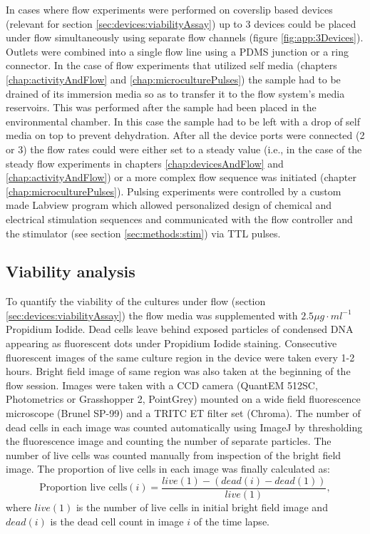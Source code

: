 In cases where flow experiments were performed on coverslip based devices (relevant for section \ref{sec:devices:viabilityAssay}) up to 3 devices could be placed under flow simultaneously using separate flow channels (figure \ref{fig:app:3Devices}). Outlets were combined into a single flow line using a PDMS junction or a ring connector. In the case of flow experiments that utilized self media (chapters \ref{chap:activityAndFlow} and \ref{chap:microculturePulses}) the sample had to be drained of its immersion media so as to transfer it to the flow system's media reservoirs. This was performed after the sample had been placed in the environmental chamber. In this case the sample had to be left with a drop of self media on top to prevent dehydration. After all the device ports were connected (2 or 3) the flow rates could were either set to a steady value (i.e., in the case of the steady flow experiments in chapters \ref{chap:devicesAndFlow} and \ref{chap:activityAndFlow}) or a more complex flow sequence was initiated (chapter \ref{chap:microculturePulses}). Pulsing experiments were controlled by a custom made Labview program which allowed personalized design of chemical and electrical stimulation sequences and communicated with the flow controller and the stimulator (see section \ref{sec:methods:stim}) via TTL pulses.






 \subsection{Viability analysis}
 To quantify the viability of the cultures under flow (section \ref{sec:devices:viabilityAssay}) the flow media was supplemented with \(2.5 \mu g\cdot ml^{-1}\) Propidium Iodide. Dead cells leave behind exposed particles of condensed DNA appearing as fluorescent dots under Propidium Iodide staining. Consecutive fluorescent images of the same culture region in the device were taken every 1-2 hours. Bright field image of same region was also taken at the beginning of the flow session. Images were taken with a CCD camera (QuantEM 512SC, Photometrics or Grasshopper 2, PointGrey) mounted on a wide field fluorescence microscope (Brunel SP-99) and a TRITC ET filter set (Chroma). The number of dead cells in each image was counted automatically using ImageJ by thresholding the fluorescence image and counting the number of separate particles. The number of live cells was counted manually from inspection of the bright field image.
The proportion of live cells in each image was finally calculated as: \[\text{Proportion live cells} (i)=\frac{live(1)-(dead(i)-dead(1))}{live(1)},\] where \(live(1)\) is the number of live cells in initial bright field image and \(dead(i)\) is the dead cell count in image \(i\) of the time lapse.

